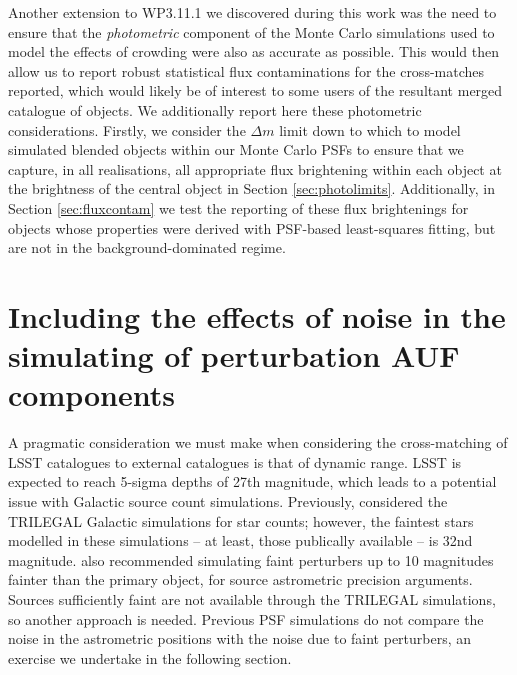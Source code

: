 \documentclass[fleqn,usenatbib]{mnras}
\begin{document}
Another extension to WP3.11.1 we discovered during this work was the need to ensure that the \textit{photometric} component of the Monte Carlo simulations used to model the effects of crowding were also as accurate as possible.
This would then allow us to report robust statistical flux contaminations for the cross-matches reported, which would likely be of interest to some users of the resultant merged catalogue of objects.
We additionally report here these photometric considerations.
Firstly, we consider the $\Delta m$ limit down to which to model simulated blended objects within our Monte Carlo PSFs to ensure that we capture, in all realisations, all appropriate flux brightening within each object at the brightness of the central object in Section \ref{sec:photolimits}.
Additionally, in Section \ref{sec:fluxcontam} we test the reporting of these flux brightenings for objects whose properties were derived with PSF-based least-squares fitting, but are not in the background-dominated regime.

\section{Including the effects of noise in the simulating of perturbation AUF components}
\label{sec:noise effects}
A pragmatic consideration we must make when considering the cross-matching of LSST catalogues to external catalogues is that of dynamic range. LSST is expected to reach 5-sigma depths of 27th magnitude, which leads to a potential issue with Galactic source count simulations. Previously, \citet{2018MNRAS.481.2148W} considered the TRILEGAL \citep{Girardi2005} Galactic simulations for star counts; however, the faintest stars modelled in these simulations -- at least, those publically available -- is 32nd magnitude. \citet{2018MNRAS.481.2148W} also recommended simulating faint perturbers up to 10 magnitudes fainter than the primary object, for source astrometric precision arguments. Sources sufficiently faint are not available through the TRILEGAL simulations, so another approach is needed. 
Previous PSF simulations do not compare the noise in the astrometric positions with the noise due to faint perturbers, an exercise we undertake in the following section.
\end{document}
